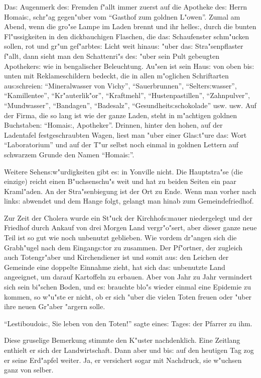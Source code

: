 \documentclass[oneside,12pt]{book}
\newcommand{\s}{s:}%
\begin{document}
Da{\s} Augenmerk de{\s} Fremden f"allt immer zuerst auf die
Apotheke de{\s} Herrn Homai{\s}, schr"ag gegen"uber vom "`Gasthof
zum goldnen L"owen"'. Zumal am Abend, wenn die gro"se Lampe im
Laden brennt und ihr helle{\s}, durch die bunten Fl"ussigkeiten in
den dickbauchigen Flaschen, die da{\s} Schaufenster schm"ucken
sollen, rot und gr"un gef"arbte{\s} Licht weit hinau{\s} "uber
da{\s} Stra"senpflaster f"allt, dann sieht man den Schattenri"s
de{\s} "uber sein Pult gebeugten Apotheker{\s} wie in bengalischer
Beleuchtung. Au"sen ist sein Hau{\s} von oben bi{\s} unten mit
Reklameschildern bedeckt, die in allen m"oglichen Schriftarten
au{\s}schreien: "`Mineralwasser von Vichy"', "`Sauerbrunnen"',
"`Selter{\s}wasser"', "`Kamillentee"', "`Kr"auterlik"or"',
"`Kraftmehl"', "`Hustenpastillen"', "`Zahnpulver"', "`Mundwasser"',
"`Bandagen"', "`Badesalz"', "`Gesundheit{\s}schokolade"' usw. usw.
Auf der Firma, die so lang ist wie der ganze Laden, steht in
m"achtigen goldnen Buchstaben: "`Homai{\s}, Apotheker"'. Drinnen,
hinter den hohen, auf der Ladentafel festgeschraubten Wagen, liest
man "uber einer Gla{\s}t"ure da{\s} Wort "`Laboratorium"' und auf
der T"ur selbst noch einmal in goldnen Lettern auf schwarzem
Grunde den Namen "`Homai{\s}"'.

Weitere Sehen{\s}w"urdigkeiten gibt e{\s} in Yonville nicht. Die
Hauptstra"se (die einzige) reicht einen B"uchsenschu"s weit und
hat zu beiden Seiten ein paar Kraml"aden. An der Stra"senbiegung
ist der Ort zu Ende. Wenn man vorher nach link{\s} abwendet und
dem Hange folgt, gelangt man hinab zum Gemeindefriedhof.

Zur Zeit der Cholera wurde ein St"uck der Kirchhof{\s}mauer
niedergelegt und der Friedhof durch Ankauf von drei Morgen Land
vergr"o"sert, aber dieser ganze neue Teil ist so gut wie noch
unbenutzt geblieben. Wie vordem dr"angen sich die Grabh"ugel nach
dem Eingang{\s}tor zu zusammen. Der Pf"ortner, der zugleich auch
Totengr"aber und Kirchendiener ist und somit au{\s} den Leichen
der Gemeinde eine doppelte Einnahme zieht, hat sich da{\s}
unbenutzte Land angeeignet, um darauf Kartoffeln zu erbauen. Aber
von Jahr zu Jahr vermindert sich sein bi"schen Boden, und e{\s}
brauchte blo"s wieder einmal eine Epidemie zu kommen, so w"u"ste
er nicht, ob er sich "uber die vielen Toten freuen oder "uber ihre
neuen Gr"aber "argern solle.

"`Lestiboudoi{\s}, Sie leben von den Toten!"' sagte eine{\s}
Tage{\s} der Pfarrer zu ihm.

Diese gruselige Bemerkung stimmte den K"uster nachdenklich. Eine
Zeitlang enthielt er sich der Landwirtschaft. Dann aber und bi{\s}
auf den heutigen Tag zog er seine Erd"apfel weiter. Ja, er
versichert sogar mit Nachdruck, sie w"uchsen ganz von selber.
\end{document}
